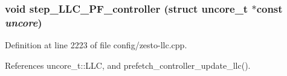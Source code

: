 \subsubsection[{step\_\-LLC\_\-PF\_\-controller}]{\setlength{\rightskip}{0pt plus 5cm}void step\_\-LLC\_\-PF\_\-controller (struct {\bf uncore\_\-t} $\ast$const  {\em uncore})}\label{zesto-cache_8h_65086cfd5f54ff7a76a41587c8f6a01e}




Definition at line 2223 of file config/zesto-llc.cpp.

References uncore\_\-t::LLC, and prefetch\_\-controller\_\-update\_\-llc().